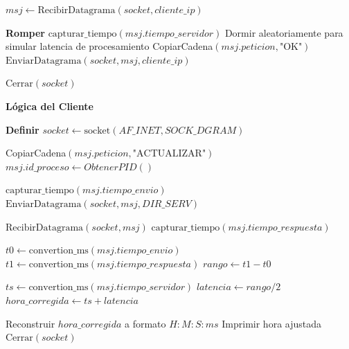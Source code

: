 \begin{tcolorbox}[colback=white, colframe=azul_unam, title=Pseudocódigo: sinc\_cristian.c, breakable]
\begin{algorithmic}[1]
        \State $msj \gets \text{RecibirDatagrama}(socket, cliente\_ip)$
        
            \State \textbf{Romper} 
            \State $\text{capturar\_tiempo}(msj.tiempo\_servidor)$ 
            \State Dormir aleatoriamente para simular latencia de procesamiento
            \State CopiarCadena$(msj.peticion, \text{"OK"})$
            \State $\text{EnviarDatagrama}(socket, msj, cliente\_ip)$ 
        \EndIf
    \EndWhile
    
    \State $\text{Cerrar}(socket)$
\EndProcedure
\end{algorithmic}

\vspace{0.3cm}

\textbf{Lógica del Cliente}
\begin{algorithmic}[1]
    \State \textbf{Definir} $socket \gets \text{socket}(AF\_INET, SOCK\_DGRAM)$
    
    \Repeat
        \State CopiarCadena$(msj.peticion, \text{"ACTUALIZAR"})$
        \State $msj.id\_proceso \gets ObtenerPID()$
        
        \State $\text{capturar\_tiempo}(msj.tiempo\_envio)$ 
        \State $\text{EnviarDatagrama}(socket, msj, DIR\_SERV)$
        
        \State $\text{RecibirDatagrama}(socket, msj)$ 
        \State $\text{capturar\_tiempo}(msj.tiempo\_respuesta)$ 
        
        \State $t0 \gets \text{convertion\_ms}(msj.tiempo\_envio)$
        \State $t1 \gets \text{convertion\_ms}(msj.tiempo\_respuesta)$
        \State $rango \gets t1 - t0$ 
        
     

    \State $ts \gets \text{convertion\_ms}(msj.tiempo\_servidor)$
    \State $latencia \gets rango / 2$
    \State $hora\_corregida \gets ts + latencia$ 
    
    \State Reconstruir $hora\_corregida$ a formato $H:M:S:ms$
    \State Imprimir hora ajustada
    \State $\text{Cerrar}(socket)$
\EndProcedure
\end{algorithmic}
\end{tcolorbox}